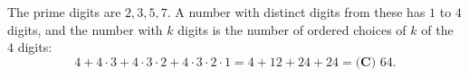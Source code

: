 The prime digits are $2,3,5,7$. A number with distinct digits from these has $1$ to $4$ digits, and the number with $k$ digits is the number of ordered choices of $k$ of the $4$ digits:
\[4+4\cdot3+4\cdot3\cdot2+4\cdot3\cdot2\cdot1=4+12+24+24=\boxed{\textbf{(C) }64}.\]
